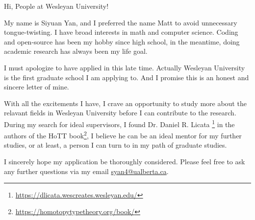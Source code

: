 \documentclass[11pt]{article}
\begin{document}
    Hi, People at Wesleyan University!

    My name is Siyuan Yan,
    and I preferred the name Matt to avoid unnecessary tongue-twisting.
    I have broad interests in math and computer science.
    Coding and open-source has been my hobby since high school,
    in the meantime, doing academic research has always been my life goal.

    I must apologize to have applied in this late time.
    Actually Wesleyan University is the first graduate school I am applying to.
    And I promise this is an honest and sincere letter of mine.

    

    

    With all the excitements I have,
    I crave an opportunity to study more about the relavant fields
    in Wesleyan University before I can contribute to the research.
    During my search for ideal supervisors,
    I found Dr. Daniel R. Licata \footnote{\url{https://dlicata.wescreates.wesleyan.edu/}} in the
    authors of the HoTT book\footnote{\url{https://homotopytypetheory.org/book/}},
    I believe he can be an ideal mentor for my further studies,
    or at least, a person I can turn to in my path of graduate studies.


    I sincerely hope my application be thoroughly considered.
    Please feel free to ask any further questions via my email \href{mailto:syan4@ualberta.ca}{syan4@ualberta.ca}.
\end{document}
